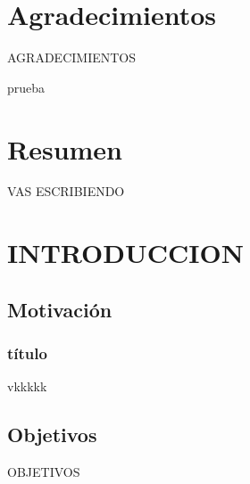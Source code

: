 \documentclass[12pt,a4paper,Spanish]{book}
\begin{document}
\chapter*{Agradecimientos} %

AGRADECIMIENTOS 

prueba

\chapter*{Resumen}

VAS ESCRIBIENDO
\tableofcontents



\cleardoublepage
{} %
\listoffigures %

\cleardoublepage
{} %
\listoftables %






\chapter{INTRODUCCION}\label{Introduccion}



\section{Motivación}


\subsection{título}


vkkkkk



\section{Objetivos} 

OBJETIVOS
\end{document}

